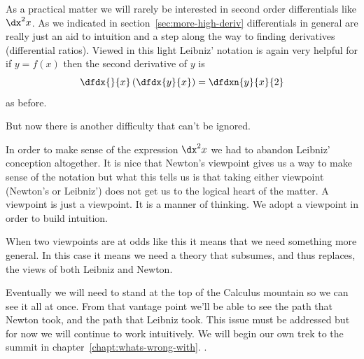 \begin{Digression}[\foreign{Hic Sunt Dracones} (Here Be Dragons)]



  As a practical matter we will rarely be interested in second order
  differentials like $\dx^2x$. As we indicated in
  section~\ref{sec:more-high-deriv} differentials in general are
  really just an aid to intuition and a step along the way to finding
  derivatives (differential ratios). Viewed in this light Leibniz'
  notation is again very helpful for if $y=f(x)$ then the second
  derivative of $y$ is
  $$
  \dfdx{}{x}\left(\dfdx{y}{x}\right) = \dfdxn{y}{x}{2}
  $$
  as before.

  But now there is another difficulty that can't be ignored.

  In order to make sense of the expression $\dx^2{x}$ we had to
  abandon Leibniz' conception altogether. It is nice that Newton's
  viewpoint gives us a way to make sense of the notation but what this
  tells us is that taking either viewpoint (Newton's or Leibniz') does
  not get us to the logical heart of the matter. A viewpoint is just a
  viewpoint. It is a manner of thinking. We adopt a viewpoint in
  order to build intuition.

  When two viewpoints are at odds like this it means that we need
  something more general. In this case it means we need a theory that
  subsumes, and thus replaces, the views of both Leibniz and Newton.

  Eventually we will need to stand at the top of the Calculus mountain
  so we can see it all at once. From that vantage point we'll be able
  to see the path that Newton took, and the path that Leibniz took.
  This issue must be addressed but for now we will continue to work
  intuitively.  We will begin our own trek to the summit in
  chapter~\ref{chapt:whats-wrong-with}. .
\end{Digression}


